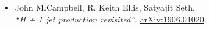 \begin{itemize}
\item John M.Campbell, R. Keith Ellis, Satyajit Seth,\\ 
{\it ``H + 1 jet production revisited''},
\href{https://arxiv.org/abs/1906.01020}{arXiv:1906.01020}
\end{itemize}

